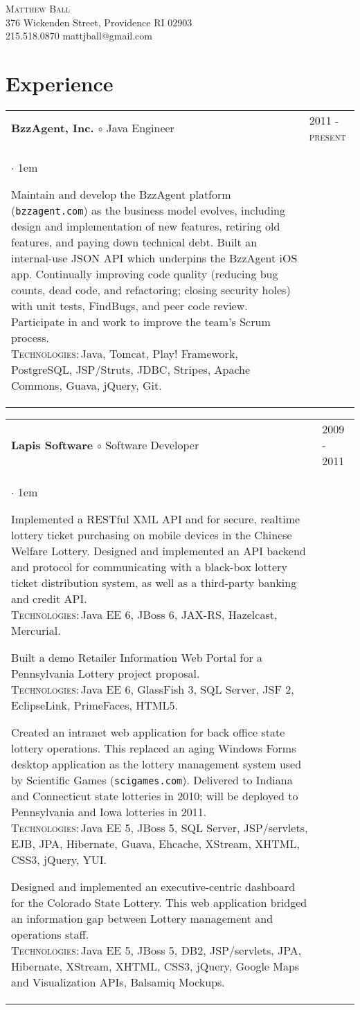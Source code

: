 \documentclass[10pt]{article}
\makeatletter
\newcommand{\employer}[4]
	{{ \begin{tabular}{l@{\hspace{5mm}}|p{30mm}}
	   \multicolumn{1}{l}{\textbf{#1 $\circ$ }#2}&\multicolumn{1}{p{30mm}}{\hspace{-3mm}\textsc{#3}} \\
	   \parbox{.825\textwidth}{#4 \vspace*{-4pt}}
	   \end{tabular} \vspace{4pt} }}
\newcommand{\contact}[4]
	{\begin{center}
		{\LARGE \scshape{#1}}\\
		#2\\
		\Telefon \hspace{0.5ex} #3 \hspace{1em} \Letter \hspace{0.5ex} #4
	\end{center}
	\vspace*{-8pt}}
\newenvironment{achievements}           %
	{\begin{list}{$\cdot$}{\topsep 0pt \itemsep 4pt \parsep 0pt \leftmargin 1em}
	 \linespread{1.05} \selectfont %
	}
	{\end{list}\vspace*{4pt}}
\def\kt{\vspace*{2pt}\\\textsc{Technologies:\,}}
\makeatother
\begin{document}
\contact{Matthew Ball}
{376 Wickenden Street, Providence RI 02903}
{215.518.0870}
{mattjball@gmail.com}

\section{Experience}
\employer{BzzAgent, Inc.}{Java Engineer}{2011 - present}{
	\begin{achievements}
	
	\item{Maintain and develop the BzzAgent platform (\texttt{bzzagent.com}) as the business model evolves, including design and implementation of new features, retiring old features, and paying down technical debt. Built an internal-use JSON API which underpins the BzzAgent iOS app. Continually improving code quality (reducing bug counts, dead code, and refactoring; closing security holes) with unit tests, FindBugs, and peer code review. Participate in and work to improve the team's Scrum process. \kt Java, Tomcat, Play! Framework, PostgreSQL, JSP/Struts, JDBC, Stripes, Apache Commons, Guava, jQuery, Git.}
	
	\end{achievements}
}

\employer{Lapis Software}{Software Developer}{2009 - 2011}{
	\begin{achievements}
	
	\item{Implemented a RESTful XML API and for secure, realtime lottery ticket purchasing on mobile devices in the Chinese Welfare Lottery. Designed and implemented an API backend and protocol for communicating with a black-box lottery ticket distribution system, as well as a third-party banking and credit API. \kt Java EE 6, JBoss 6, JAX-RS, Hazelcast, Mercurial.}
	
	\item{Built a demo Retailer Information Web Portal for a Pennsylvania Lottery project proposal. \kt Java EE 6, GlassFish 3, SQL Server, JSF 2, EclipseLink, PrimeFaces, HTML5.}
	
	\item{Created an intranet web application for back office state lottery operations. This replaced an aging Windows Forms desktop application as the lottery management system used by Scientific Games (\texttt{scigames.com}). Delivered to Indiana and Connecticut state lotteries in 2010; will be deployed to Pennsylvania and Iowa lotteries in 2011. \kt Java EE 5, JBoss 5, SQL Server, JSP/servlets, EJB, JPA, Hibernate, Guava, Ehcache, XStream, XHTML, CSS3, jQuery, YUI.}
	
	\item{Designed and implemented an executive-centric dashboard for the Colorado State Lottery. This web application bridged an information gap between Lottery management and operations staff. \kt Java EE 5, JBoss 5, DB2, JSP/servlets, JPA, Hibernate, XStream, XHTML, CSS3, jQuery, Google Maps and Visualization APIs, Balsamiq Mockups.}
	
	\end{achievements}
}
\end{document}
